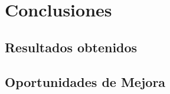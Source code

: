   \label{chap:cap5}
  \chapter {Conclusiones}
    \section {Resultados obtenidos}
    \section {Oportunidades de Mejora}
